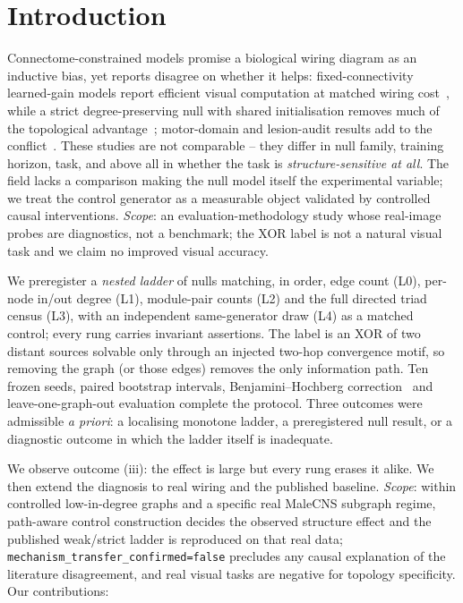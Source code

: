 \documentclass[10pt,twocolumn,letterpaper]{article}
\begin{document}
\section{Introduction}
\label{sec:intro}

Connectome-constrained models promise a biological wiring diagram as an
inductive bias, yet reports disagree on whether it helps: fixed-connectivity
learned-gain models report efficient visual computation at matched wiring
cost~\cite{structurealone2026}, while a strict degree-preserving null with
shared initialisation removes much of the topological
advantage~\cite{toposens2026}; motor-domain and lesion-audit results add to
the conflict~\cite{flygm2026,flyhack2026}. These studies are not comparable --
they differ in null family, training horizon, task, and above all in whether
the task is \emph{structure-sensitive at all}. The field lacks a comparison
making the null model itself the experimental variable; we treat the control
generator as a measurable object validated by controlled causal interventions.
\emph{Scope}: an evaluation-methodology study whose real-image probes are
diagnostics, not a benchmark; the XOR label is not a natural visual task and
we claim no improved visual accuracy.

We preregister a \emph{nested ladder} of nulls matching, in order, edge count
(L0), per-node in/out degree (L1), module-pair counts (L2) and the full
directed triad census (L3), with an independent same-generator draw (L4) as a
matched control; every rung carries invariant assertions. The label is an XOR
of two distant sources solvable only through an injected two-hop convergence
motif, so removing the graph (or those edges) removes the only information
path. Ten frozen seeds, paired bootstrap intervals, Benjamini--Hochberg
correction~\cite{benjamini1995} and leave-one-graph-out evaluation complete
the protocol. Three outcomes were admissible \emph{a priori}: a localising
monotone ladder, a preregistered null result, or a diagnostic outcome in
which the ladder itself is inadequate.

We observe outcome (iii): the effect is large but every rung erases it alike.
We then extend the diagnosis to real wiring and the published baseline.
\emph{Scope}: within controlled low-in-degree graphs and a specific real
MaleCNS subgraph regime, path-aware control construction decides the observed
structure effect and the published weak/strict ladder is reproduced on that
real data; \texttt{mechanism\_transfer\_confirmed=false} precludes any causal
explanation of the literature disagreement, and real visual tasks are negative
for topology specificity. Our contributions:
\end{document}
